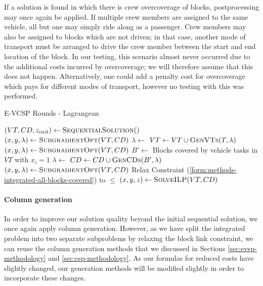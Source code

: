 \documentclass[]{article}
\begin{document}
If a solution is found in which there is crew overcoverage of blocks, postprocessing may once again be applied. If multiple crew members are assigned to the same vehicle, all but one may simply ride along as a passenger. Crew members may also be assigned to blocks which are not driven; in that case, another mode of transport must be arranged to drive the crew member between the start and end location of the block. In our testing, this scenario almost never occurred due to the additional costs incurred by overcoverage; we will therefore assume that this does not happen. Alternatively, one could add a penalty cost for overcoverage which pays for different modes of transport, however no testing with this was performed.

\begin{algorithm}
\caption{E-VCSP Rounds - Lagrangean}\label{alg:E-VCSP-lagrange}
\begin{algorithmic}
\State $(VT, CD, z_{init}) \gets \Call{SequentialSolution}$
\State $(x, y, \lambda) \gets \Call{SubgradientOpt}{VT, CD}$
    \State $\lambda \gets$ 
    \State $VT \gets VT \cup \Call{GenVTs}{T, \lambda}$
    \State $(x, y, \lambda) \gets \Call{SubgradientOpt}{VT, CD}$
  \EndFor
    \State $B' \gets$ Blocks covered by vehicle tasks in $VT$ with $x_i = 1$
    \State $\lambda \gets$ 
    \State $CD \gets CD \cup \Call{GenCDs}{B', \lambda}$
    \State $(x, y, \lambda) \gets \Call{SubgradientOpt}{VT, CD}$
  \EndFor
\EndWhile
\State Relax Constraint (\ref{form:methods-integrated-all-blocks-covered}) to $\leq$
\State $(x, y, z) \gets \Call{SolveILP}{VT, CD}$
\end{algorithmic}
\end{algorithm}

\paragraph{Column generation} \label{sec:evcsp-cg}
In order to improve our solution quality beyond the initial sequential solution, we once again apply column generation. However, as we have split the integrated problem into two separate subproblems by relaxing the block link constraint, we can reuse the column generation methods that we discussed in Sections \ref{sec:evsp-methodology} and \ref{sec:csp-methodology}. As our formulas for reduced costs have slightly changed, our generation methods will be modified slightly in order to incorporate these changes.
\end{document}
